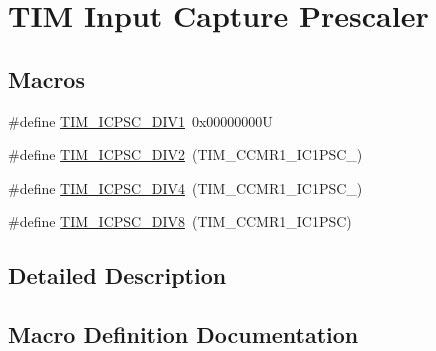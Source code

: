 \hypertarget{group___t_i_m___input___capture___prescaler}{}\section{T\+IM Input Capture Prescaler}
\label{group___t_i_m___input___capture___prescaler}
\subsection*{Macros}
\begin{DoxyCompactItemize}
\item 
\#define \hyperlink{group___t_i_m___input___capture___prescaler_ga8acb44abe3147d883685c1f9f1ce410e}{T\+I\+M\+\_\+\+I\+C\+P\+S\+C\+\_\+\+D\+I\+V1}~0x00000000U
\item 
\#define \hyperlink{group___t_i_m___input___capture___prescaler_ga1d8a7b66add914e2ddd910d2d700978f}{T\+I\+M\+\_\+\+I\+C\+P\+S\+C\+\_\+\+D\+I\+V2}~(T\+I\+M\+\_\+\+C\+C\+M\+R1\+\_\+\+I\+C1\+P\+S\+C\+\_)
\item 
\#define \hyperlink{group___t_i_m___input___capture___prescaler_gaf5a675046430fa0f0c95b0dac612828f}{T\+I\+M\+\_\+\+I\+C\+P\+S\+C\+\_\+\+D\+I\+V4}~(T\+I\+M\+\_\+\+C\+C\+M\+R1\+\_\+\+I\+C1\+P\+S\+C\+\_)
\item 
\#define \hyperlink{group___t_i_m___input___capture___prescaler_ga5086cb03c89a5c67b199d20b605f00cb}{T\+I\+M\+\_\+\+I\+C\+P\+S\+C\+\_\+\+D\+I\+V8}~(T\+I\+M\+\_\+\+C\+C\+M\+R1\+\_\+\+I\+C1\+P\+SC)
\end{DoxyCompactItemize}


\subsection{Detailed Description}


\subsection{Macro Definition Documentation}
\mbox{\label{group___t_i_m___input___capture___prescaler_ga8acb44abe3147d883685c1f9f1ce410e}} 
